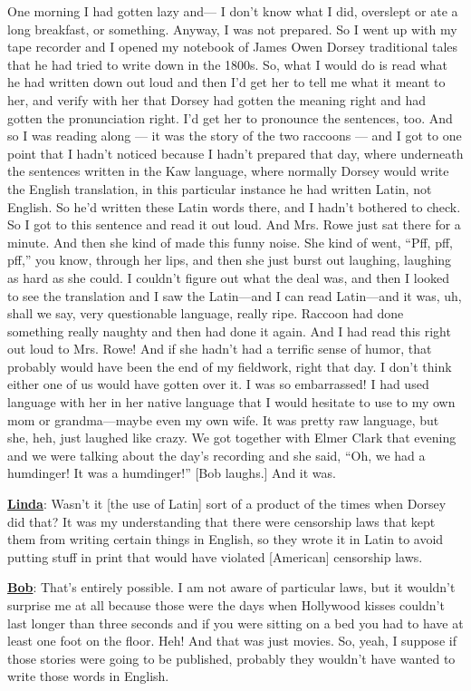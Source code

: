 \documentclass[output=paper]{LSP/langsci}
\begin{document}
One morning I had gotten lazy and--- I don't know what I did, overslept or ate a long breakfast, or something. Anyway, I was not prepared. So I went up with my tape recorder and I opened my notebook of James Owen Dorsey traditional tales that he had tried to write down in the 1800s. So, what I would do is read what he had written down out loud and then I'd get her to tell me what it meant to her, and verify with her that Dorsey had gotten the meaning right and had gotten the pronunciation right. I'd get her to pronounce the sentences, too. And so I was reading along --- it was the story of the two raccoons --- and I got to one point that I hadn't noticed because I hadn't prepared that day, where underneath the sentences written in the Kaw language, where normally Dorsey would write the English translation, in this particular instance he had written Latin, not English. So he'd written these Latin words there, and I hadn't bothered to check. So I got to this sentence and read it out loud. And Mrs. Rowe just sat there for a minute. And then she kind of made this funny noise. She kind of went, ``Pff, pff, pff,'' you know, through her lips, and then she just burst out laughing, laughing as hard as she could. I couldn't figure out what the deal was, and then I looked to see the translation and I saw the Latin---and I can read Latin---and it was, uh, shall we say, very questionable language, really ripe. Raccoon had done something really naughty and then had done it again. And I had read this right out loud to Mrs. Rowe! And if she hadn't had a terrific sense of humor, that probably would have been the end of my fieldwork, right that day. I don't think either one of us would have gotten over it. I was so embarrassed! I had used language with her in her native language that I would hesitate to use to my own mom or grandma---maybe even my own wife. It was pretty raw language, but she, heh, just laughed like crazy. We got together with Elmer Clark that evening and we were talking about the day's recording and she said, ``Oh, we had a humdinger! It was a humdinger!'' [Bob laughs.] And it was.

\textbf{\underline{Linda}}: Wasn't it [the use of Latin] sort of a product of the times when Dorsey did that? It was my understanding that there were censorship laws that kept them from writing certain things in English, so they wrote it in Latin to avoid putting stuff in print that would have violated [American] censorship laws.

\textbf{\underline{Bob}}: That's entirely possible. I am not aware of particular laws, but it wouldn't surprise me at all because those were the days when Hollywood kisses couldn't last longer than three seconds and if you were sitting on a bed you had to have at least one foot on the floor. Heh! And that was just movies. So, yeah, I suppose if those stories were going to be published, probably they wouldn't have wanted to write those words in English.
\end{document}
